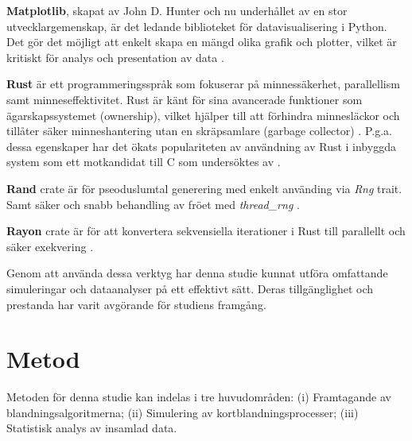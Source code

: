 \documentclass[swedish,a4paper]{article}
\begin{document}
\textbf{Matplotlib}, skapat av John D. Hunter och nu underhållet av en stor
utvecklargemenskap, är det ledande biblioteket för datavisualisering i Python.
Det gör det möjligt att enkelt skapa en mängd olika grafik och plotter, vilket
är kritiskt för analys och presentation av data \parencite{matplotlib}.

\textbf{Rust} är ett programmeringsspråk som fokuserar på
minnessäkerhet, parallellism samt minneseffektivitet. Rust är känt för
sina avancerade funktioner som ägarskapssystemet (ownership), vilket
hjälper till att förhindra minnesläckor och tillåter säker
minneshantering utan en skräpsamlare (garbage collector)
\parencite{rust}. 
P.g.a. dessa egenskaper har det ökats populariteten av användning av Rust i
inbyggda system som ett motkandidat till C som undersöktes av \textcite{sharma2023rust}.

\textbf{Rand} \gls{crate} är för pseoduslumtal generering med enkelt använding via \textit{Rng} trait. Samt säker och snabb behandling av fröet med \textit{thread\_rng} \parencite{rand_crate}.

\textbf{Rayon} \gls{crate}  är för att konvertera sekvensiella 
iterationer i Rust till parallellt och säker exekvering 
\parencite{rayon_crate}.

Genom att använda dessa verktyg har denna studie kunnat utföra omfattande
simuleringar och dataanalyser på ett effektivt sätt. Deras tillgänglighet och
prestanda har varit avgörande för studiens framgång.




\section{Metod} 
Metoden för denna studie kan indelas i tre huvudområden:
(i) Framtagande av  blandningsalgoritmerna;
(ii) Simulering av kortblandningsprocesser;
(iii) Statistisk analys av insamlad data.
\end{document}
